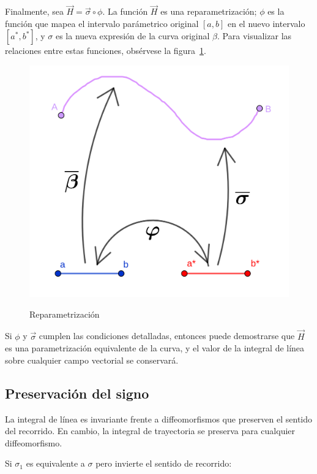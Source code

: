 \documentclass{article}
\begin{document}
Finalmente, sea $\overrightarrow{H} = \overrightarrow{\sigma} \circ \phi$. La función $\overrightarrow{H}$ es una reparametrización; $\phi$ es la función que mapea el intervalo parámetrico original $[a,b]$ en el nuevo intervalo $[a^*, b^*]$, y $\sigma$ es la nueva expresión de la curva original $\beta$. Para visualizar las relaciones entre estas funciones, obsérvese la figura~\ref{fig:reparam}.

\begin{figure}[ht]
\centering
\caption{Reparametrización}
\includegraphics[scale=0.7]{img/integrales/reparametrizacion.png}
\label{fig:reparam}
\end{figure}

Si $\phi$ y $\overrightarrow{\sigma}$ cumplen las condiciones detalladas, entonces puede demostrarse que $\overrightarrow{H}$ es una parametrización equivalente de la curva, y el valor de la integral de línea sobre cualquier campo vectorial se conservará.

\subsection{Preservación del signo}

La integral de línea es invariante frente a diffeomorfismos que preserven el sentido del recorrido. En cambio, la integral de trayectoria se preserva para cualquier diffeomorfismo.

Si $\sigma_1$ es equivalente a $\sigma$ pero invierte el sentido de recorrido:
\end{document}
